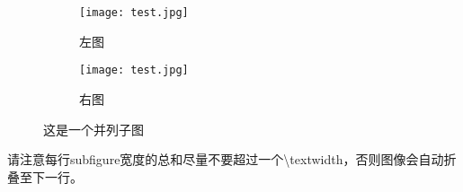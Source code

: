 \begin{figure}[H]
\centering
\begin{subfigure}{.45\textwidth}
  \centering
  \texttt{[image: test.jpg]}
  \caption{左图}
  \label{fig:test_subfigure1}
\end{subfigure}
\begin{subfigure}{.45\textwidth}
  \centering
  \texttt{[image: test.jpg]}
  \caption{右图}
  \label{fig:test_subfigure2}
\end{subfigure}
\caption{这是一个并列子图}
\label{fig:test_subfigure}
\end{figure}

请注意每行subfigure宽度的总和尽量不要超过一个\textbackslash textwidth，否则图像会自动折叠至下一行。
